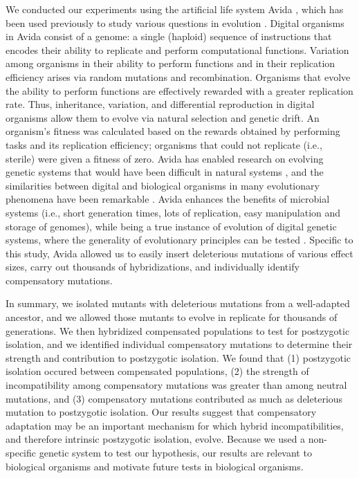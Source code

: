 \documentclass[12pt]{article}
\begin{document}
We conducted our experiments using the artificial life system
Avida \cite{ofr04}, which has been used previously to study various questions
in evolution \cite{len99,len03,cho04,mis06,ele07,ele08,mis10}.
%
Digital organisms in Avida consist of a genome:
a single (haploid) sequence of instructions that encodes
their ability to replicate and perform computational functions.
%
Variation among organisms in their ability to perform functions
and in their replication efficiency
arises via random mutations and recombination.
%
Organisms that evolve the ability to perform functions
are effectively rewarded with a greater replication rate.
%
Thus, inheritance, variation, and differential reproduction
in digital organisms allow them to evolve
via natural selection and genetic drift.
%
An organism's fitness was calculated based on the rewards
obtained by performing tasks and its replication efficiency;
organisms that could not replicate (i.e., sterile)
were given a fitness of zero.
%
Avida has enabled research on evolving genetic systems
that would have been difficult in natural systems \cite{ada06},
and the similarities between digital and biological organisms
in many evolutionary phenomena have been remarkable \cite{wil02,ada06}.
%
Avida enhances the benefits of microbial systems
(i.e., short generation times, lots of replication,
easy manipulation and storage of genomes),
while being a true instance of evolution of digital genetic systems,
where the generality of evolutionary principles can be tested
\cite{len99,ele08,mis06}.
%
Specific to this study, Avida allowed us to easily insert deleterious mutations
of various effect sizes, carry out thousands of hybridizations,
and individually identify compensatory mutations.



In summary, we isolated mutants with deleterious mutations
from a well-adapted ancestor, and we allowed those mutants to evolve
in replicate for thousands of generations.
%
We then hybridized compensated populations to test for postzygotic isolation,
and we identified individual compensatory mutations to determine
their strength and contribution to postzygotic isolation.
%
We found that (1) postzygotic isolation occured between compensated populations,
(2) the strength of incompatibility among compensatory mutations
was greater than among neutral mutations, and
(3) compensatory mutations contributed as much as deleterious mutation
to postzygotic isolation.
%
Our results suggest that compensatory adaptation may be an important
mechanism for which hybrid incompatibilities, and therefore
intrinsic postzygotic isolation, evolve.
%
Because we used a non-specific genetic system to test our hypothesis,
our results are relevant to biological organisms and motivate
future tests in biological organisms.
\end{document}
